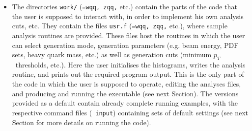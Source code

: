 \documentclass[paper]{JHEP3}
\def    \pt             {\mbox{$p_T$}}
\begin{document}
\begin{appendix}
\begin{itemize}
\item The directories {\tt *work/} ({\tt *=wqq, zqq,} etc.)  contain
    the parts of the code that the user is supposed to interact with,
    in order to implement his own analysis cuts, etc.  They contain
    the files {\tt *usr.f} ({\tt *=wqq, zqq,} etc.), where sample
    analysis routines are provided. These files host the routines in
    which the user can select generation mode, generation parameters
    (e.g. beam energy, PDF sets, heavy quark mass, etc.) as well as
    generation cuts (minimum \pt\ thresholds, etc.). Here the user
    initialises the histograms, writes the analysis routine, and
    prints out the required program output.  This is the only part of
    the code in which the user is supposed to operate, editing the
    analyses files, and producing and running the executable (see next
    Section). The versions provided as a default contain already
    complete running examples, with the respective command files ({\tt
    input}) containing sets of default settings (see next Section for
    more details on running the code).
    

\end{itemize}
\end{appendix}
\end{document}
